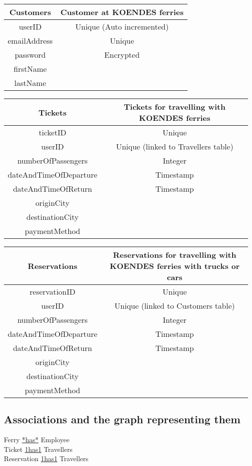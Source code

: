 \begin{table}[H]
\begin{tabular}{|c|c}
\cline{1-1}
Customers & Customer at KOENDES ferries \\ \hline
userID & Unique (Auto incremented) \\ emailAddress & Unique \\ password & Encrypted \\ firstName \\ lastName \\ \hline
\end{tabular}
\end{table}

\begin{table}[H]
\begin{tabular}{|c|c}
\cline{1-1}
Tickets & Tickets for travelling with KOENDES ferries \\ \hline
ticketID & Unique \\ userID &  Unique (linked to Travellers table)  \\ numberOfPassengers & Integer \\ dateAndTimeOfDeparture & Timestamp \\ dateAndTimeOfReturn & Timestamp \\ originCity \\ destinationCity \\ paymentMethod \\\hline
\end{tabular}
\end{table}

\begin{table}[H]
\begin{tabular}{|c|c}
\cline{1-1}
Reservations & Reservations for travelling with KOENDES ferries with trucks or cars \\ \hline
reservationID & Unique \\ userID & Unique (linked to Customers table) \\ numberOfPassengers & Integer \\ dateAndTimeOfDeparture & Timestamp \\ dateAndTimeOfReturn & Timestamp \\ originCity \\ destinationCity \\ paymentMethod  \\\hline
\end{tabular}
\end{table}
\subsection{Associations and the graph representing them}
Ferry \underline{*\phantom{x}\hspace{5ex}has\phantom{x}\hspace{5ex}*} Employee\\
Ticket \underline{1\phantom{x}\hspace{5ex}has\phantom{x}\hspace{5ex}1} Travellers\\
Reservation \underline{1\phantom{x}\hspace{5ex}has\phantom{x}\hspace{5ex}1} Travellers\\